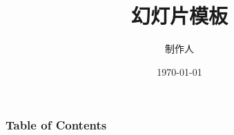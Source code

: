 \documentclass[aspectratio=169,11pt,a4paper,c]{beamer}
\title{幻灯片模板}
\author{制作人}
\institute{所属机构}
\date{\today}
\begin{document}
\begin{frame}
    \titlepage
\end{frame}

\begin{frame}
    \frametitle{Table of Contents}
    \tableofcontents
\end{frame}



% 

\end{document}
